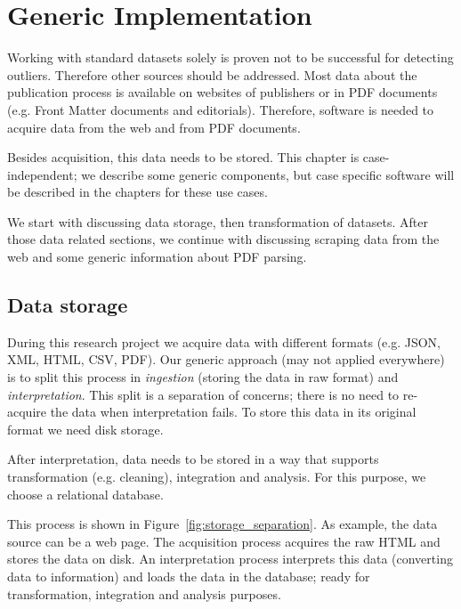 \documentclass{ou-report}
\begin{document}
\chapter{Generic Implementation}
\label{chp:generic_implementation}

Working with standard datasets solely is proven not to be successful for 
detecting outliers\cite{TEJ2017}.
Therefore other sources should be addressed. Most data about the publication 
process is available on websites of publishers or in PDF documents (e.g. Front 
Matter documents and editorials).
Therefore, software is needed to acquire data from the web and 
from PDF documents. 

Besides acquisition, this data needs to be stored. This 
chapter is case-independent; we describe some generic components, but case 
specific software will be described in the chapters for these use cases.

We start with discussing data storage, then transformation of datasets. After
those data related sections, we continue with discussing scraping data from the 
web and some generic information about PDF parsing.

\section{Data storage}
During this research project we acquire data with different formats (e.g. JSON, 
XML, HTML, CSV, PDF). Our generic approach (may not applied everywhere) is to split 
this process in \textit{ingestion} (storing the data in raw format) and
\textit{interpretation}. 
This split is a separation of concerns; there is no need to re-acquire the data when 
interpretation fails. To store this data in its original format we need disk storage.

After interpretation, data needs to be stored in a way that supports transformation 
(e.g. cleaning), integration and analysis. For this purpose, we choose a relational 
database.

This process is shown in Figure~\ref{fig:storage_separation}. As example, the data 
source can be a web page. The acquisition process acquires the raw HTML and stores the
data on disk. An interpretation process interprets this data (converting data to 
information) and loads the data in the database; ready for transformation, integration
and analysis purposes.
\end{document}
